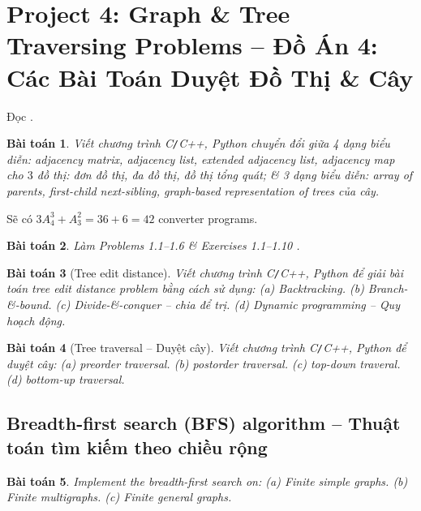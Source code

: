 \documentclass{article}
\newtheorem{baitoan}{Bài toán}
\begin{document}

\section{Project 4: Graph \& Tree Traversing Problems -- Đồ Án 4: Các Bài Toán Duyệt Đồ Thị \& Cây}
Đọc \cite[1.3: Representation of Trees \& Graphs, p. 23]{Valiente2021}.
\begin{baitoan}
    Viết chương trình {\sf C{\tt/}C++, Python} chuyển đổi giữa 4 dạng biểu diễn: adjacency matrix, adjacency list, extended adjacency list, adjacency map cho $3$ đồ thị: đơn đồ thị, đa đồ thị, đồ thị tổng quát; \& 3 dạng biểu diễn: array of parents, first-child next-sibling, graph-based representation of trees của cây.
\end{baitoan}
Sẽ có $3A_4^3 + A_3^2 = 36 + 6 = 42$ converter programs.

\begin{baitoan}
    Làm {\rm Problems 1.1--1.6 \& Exercises 1.1--1.10 \cite[pp. 39--40]{Valiente2021}}.
\end{baitoan}

\begin{baitoan}[Tree edit distance]
    Viết chương trình {\sf C{\tt/}C++, Python} để giải bài toán tree edit distance problem bằng cách sử dụng: (a) Backtracking. (b) Branch-\&-bound. (c) Divide-\&-conquer -- chia để trị. (d) Dynamic programming -- Quy hoạch động.
\end{baitoan}

\begin{baitoan}[Tree traversal -- Duyệt cây]
    Viết chương trình {\sf C{\tt/}C++, Python} để duyệt cây: (a) preorder traversal. (b) postorder traversal. (c) top-down traveral. (d) bottom-up traversal.
\end{baitoan}


\subsection{Breadth-first search (BFS) algorithm -- Thuật toán tìm kiếm theo chiều rộng}

\begin{baitoan}
    Implement the breadth-first search on: (a) Finite simple graphs. (b) Finite multigraphs. (c) Finite general graphs.
\end{baitoan}
\end{document}
